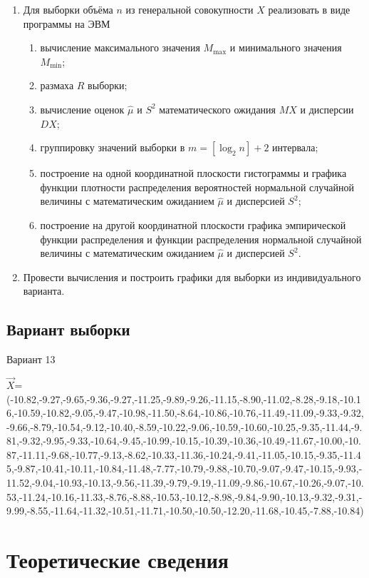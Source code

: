 \documentclass[12pt]{report}
\begin{document}
\begin{enumerate}
	\item Для выборки объёма $n$ из генеральной совокупности $X$ реализовать в виде программы на ЭВМ
	\begin{enumerate}
		\item вычисление максимального значения $M_{\max}$ и минимального значения $M_{\min}$;
		\item размаха $R$ выборки;
		\item вычисление оценок $\hat\mu$ и $S^2$ математического ожидания $MX$ и дисперсии $DX$;
		\item группировку значений выборки в $m = [\log_2 n] + 2$ интервала;
		\item построение на одной координатной плоскости гистограммы и графика функции плотности распределения вероятностей нормальной случайной величины с математическим ожиданием $\hat{\mu}$ и дисперсией $S^2$;
		\item построение на другой координатной плоскости графика эмпирической функции распределения и функции распределения нормальной случайной величины с математическим ожиданием $\hat{\mu}$ и дисперсией $S^2$.
	\end{enumerate}
	\item Провести вычисления и построить графики для выборки из индивидуального варианта.
\end{enumerate}

\section*{Вариант выборки}
Вариант 13

$\vec{X}$=(-10.82,-9.27,-9.65,-9.36,-9.27,-11.25,-9.89,-9.26,-11.15,-8.90,-11.02,-8.28,-9.18,-10.16,-10.59,-10.82,-9.05,-9.47,-10.98,-11.50,-8.64,-10.86,-10.76,-11.49,-11.09,-9.33,-9.32,-9.66,-8.79,-10.54,-9.12,-10.40,-8.59,-10.22,-9.06,-10.59,-10.60,-10.25,-9.35,-11.44,-9.81,-9.32,-9.95,-9.33,-10.64,-9.45,-10.99,-10.15,-10.39,-10.36,-10.49,-11.67,-10.00,-10.87,-11.11,-9.68,-10.77,-9.13,-8.62,-10.33,-11.36,-10.24,-9.41,-11.05,-10.15,-9.35,-11.45,-9.87,-10.41,-10.11,-10.84,-11.48,-7.77,-10.79,-9.88,-10.70,-9.07,-9.47,-10.15,-9.93,-11.52,-9.04,-10.93,-10.13,-9.56,-11.39,-9.79,-9.19,-11.09,-9.86,-10.67,-10.26,-9.07,-10.53,-11.24,-10.16,-11.33,-8.76,-8.88,-10.53,-10.12,-8.98,-9.84,-9.90,-10.13,-9.32,-9.31,-9.99,-8.55,-11.64,-11.32,-10.51,-11.71,-10.50,-10.50,-12.20,-11.68,-10.45,-7.88,-10.84)

\chapter*{Теоретические сведения}
\end{document}
